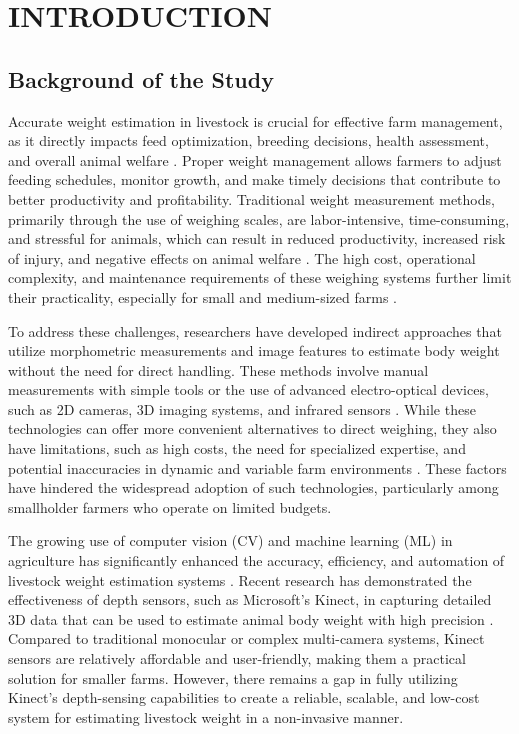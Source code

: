 \chapter{INTRODUCTION}

{\baselineskip

\section{Background of the Study}

Accurate weight estimation in livestock is crucial for effective farm management, as it directly impacts feed optimization, breeding decisions, health assessment, and overall animal welfare \citep{wang2024review}. Proper weight management allows farmers to adjust feeding schedules, monitor growth, and make timely decisions that contribute to better productivity and profitability. Traditional weight measurement methods, primarily through the use of weighing scales, are labor-intensive, time-consuming, and stressful for animals, which can result in reduced productivity, increased risk of injury, and negative effects on animal welfare \citep{faucitano2018transport}. The high cost, operational complexity, and maintenance requirements of these weighing systems further limit their practicality, especially for small and medium-sized farms \citep{dickinson2013automated}.

To address these challenges, researchers have developed indirect approaches that utilize morphometric measurements and image features to estimate body weight without the need for direct handling. These methods involve manual measurements with simple tools or the use of advanced electro-optical devices, such as 2D cameras, 3D imaging systems, and infrared sensors \citep{wang2024review}. While these technologies can offer more convenient alternatives to direct weighing, they also have limitations, such as high costs, the need for specialized expertise, and potential inaccuracies in dynamic and variable farm environments \citep{terence2024systematic}. These factors have hindered the widespread adoption of such technologies, particularly among smallholder farmers who operate on limited budgets.

The growing use of computer vision (CV) and machine learning (ML) in agriculture has significantly enhanced the accuracy, efficiency, and automation of livestock weight estimation systems \citep{gjergji2020deep}. Recent research has demonstrated the effectiveness of depth sensors, such as Microsoft's Kinect, in capturing detailed 3D data that can be used to estimate animal body weight with high precision \citep{pezzuolo2018barn}. Compared to traditional monocular or complex multi-camera systems, Kinect sensors are relatively affordable and user-friendly, making them a practical solution for smaller farms. However, there remains a gap in fully utilizing Kinect's depth-sensing capabilities to create a reliable, scalable, and low-cost system for estimating livestock weight in a non-invasive manner.

}
